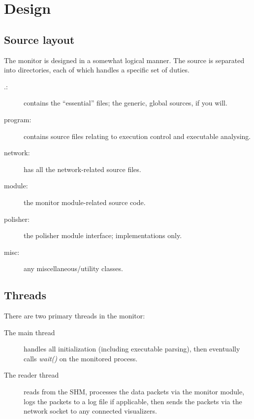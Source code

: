 \section{Design}
\subsection{Source layout}
The monitor is designed in a somewhat logical manner. The source is separated into directories, each of which handles a
specific set of duties.

\begin{description}
 \item[.:] contains the ``essential'' files; the generic, global sources, if you will.
 \item[program:] contains source files relating to execution control and executable analysing.
 \item[network:] has all the network-related source files.
 \item[module:] the monitor module-related source code.
 \item[polisher:] the polisher module interface; implementations only.
 \item[misc:] any miscellaneous/utility classes.
\end{description}

\subsection{Threads}

There are two primary threads in the monitor:
\begin{description}
 \item[\textnormal{The} main thread] handles all initialization (including executable parsing), then eventually calls
\emph{wait()} on the monitored process.
 \item[\textnormal{The} reader thread] reads from the SHM, processes the data packets via the monitor module, logs the
packets to a log file if applicable, then sends the packets via the network socket to any connected visualizers.
\end{description}
